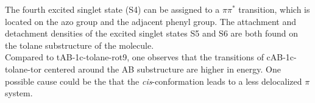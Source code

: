 The fourth excited singlet state (S4) can be assigned to a $\pi\pi^*$ transition, which is located on the azo group and the adjacent phenyl group. 
The attachment and detachment densities of the excited singlet states S5 and S6 are both found on the tolane substructure of the molecule.\\
Compared to tAB-1c-tolane-rot9, one observes that the transitions of cAB-1c-tolane-tor centered around the AB substructure are higher in energy.
One possible cause could be the that the \textit{cis}-conformation leads to a less delocalized $\pi$ system.
% 
% 
%
%
%
%
%
